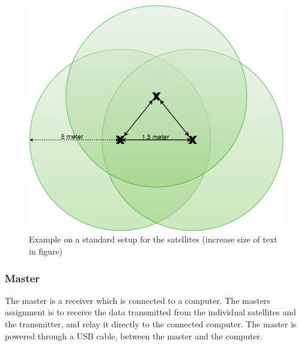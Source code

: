 \begin{figure}[H]
	\centering
	\includegraphics[scale=0.5]{figures/ReceiverSetup.png}
	\caption{Example on a standard setup for the satellites (increase size of text in figure)}
	\label{receiverSetup}
\end{figure}

\subsubsection{Master}
The master is a receiver which is connected to a computer. The masters assignment is to receive the data transmitted from the individual satellites and the transmitter, and relay it directly to the connected computer. The master is powered through a USB cable, between the master and the computer.\\

